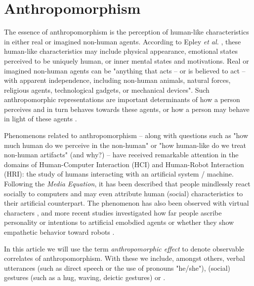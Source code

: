 \documentclass{acm_proc_article-sp}
\begin{document}

\section{Anthropomorphism}
\label{sec:intro}


The essence of anthropomorphism is the perception of human-like characteristics
in either real or imagined non-human agents. According to Epley \textit{et al.}
\cite{epley_when_2008}, these human-like characteristics may include physical
appearance, emotional states perceived to be uniquely human, or inner mental
states and motivations. Real or imagined non-human agents can be "anything that
acts -- or is believed to act -- with apparent independence, including
non-human animals, natural forces, religious agents, technological gadgets, or
mechanical devices". Such anthropomorphic representations are important
determinants of how a person perceives and in turn behaves towards these
agents, or how a person may behave in light of these agents
\cite{epley_when_2008}.

	
Phenomenons related to anthropomorphism -- along with questions such as "how
much human do we perceive in the non-human" or "how human-like do we treat
non-human artifacts" (and why?) -- have received remarkable attention in the
domains of Human-Computer Interaction (HCI) and Human-Robot Interaction (HRI):
the study of humans interacting with an artificial system / machine. Following
the \textit{Media Equation}, it has been described that people mindlessly react
socially to computers \cite{reeves_media_1996} and may even attribute human
(social) characteristics to their artificial counterpart. The phenomenon has
also been observed with virtual characters , and more recent studies investigated how
far people ascribe personality or intentions to artificial emobdied agents or
whether they show empathetic behavior toward robots
\cite{rosenthal-vonderputten_experimental_2013}. 

In this article we will use the term \emph{anthropomorphic effect} to denote
observable correlates of anthropomorphism. With these we include, amongst
others, verbal utterances (such as direct speech or the use of pronouns
"he/she"), (social) gestures (such as a hug, waving, deictic gestures) or
.
\end{document}
